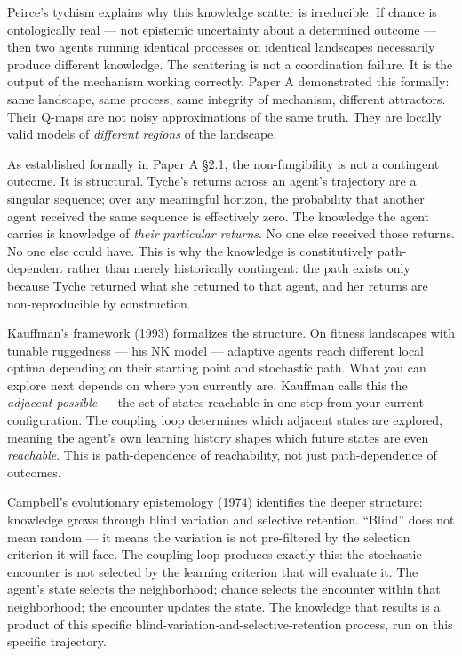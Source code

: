 \documentclass[
]{article}
\begin{document}
Peirce's tychism explains why this knowledge scatter is irreducible. If
chance is ontologically real --- not epistemic uncertainty about a
determined outcome --- then two agents running identical processes on
identical landscapes necessarily produce different knowledge. The
scattering is not a coordination failure. It is the output of the
mechanism working correctly. Paper A demonstrated this formally: same
landscape, same process, same integrity of mechanism, different
attractors. Their Q-maps are not noisy approximations of the same truth.
They are locally valid models of \emph{different regions} of the
landscape.

As established formally in Paper A §2.1, the non-fungibility is not a
contingent outcome. It is structural. Tyche's returns across an agent's
trajectory are a singular sequence; over any meaningful horizon, the
probability that another agent received the same sequence is effectively
zero. The knowledge the agent carries is knowledge of \emph{their
particular returns}. No one else received those returns. No one else
could have. This is why the knowledge is constitutively path-dependent
rather than merely historically contingent: the path exists only because
Tyche returned what she returned to that agent, and her returns are
non-reproducible by construction.

Kauffman's framework (1993) formalizes the structure. On fitness
landscapes with tunable ruggedness --- his NK model --- adaptive agents
reach different local optima depending on their starting point and
stochastic path. What you can explore next depends on where you
currently are. Kauffman calls this the \emph{adjacent possible} --- the
set of states reachable in one step from your current configuration. The
coupling loop determines which adjacent states are explored, meaning the
agent's own learning history shapes which future states are even
\emph{reachable}. This is path-dependence of reachability, not just
path-dependence of outcomes.

Campbell's evolutionary epistemology (1974) identifies the deeper
structure: knowledge grows through blind variation and selective
retention. ``Blind'' does not mean random --- it means the variation is
not pre-filtered by the selection criterion it will face. The coupling
loop produces exactly this: the stochastic encounter is not selected by
the learning criterion that will evaluate it. The agent's state selects
the neighborhood; chance selects the encounter within that neighborhood;
the encounter updates the state. The knowledge that results is a product
of this specific blind-variation-and-selective-retention process, run on
this specific trajectory.
\end{document}
